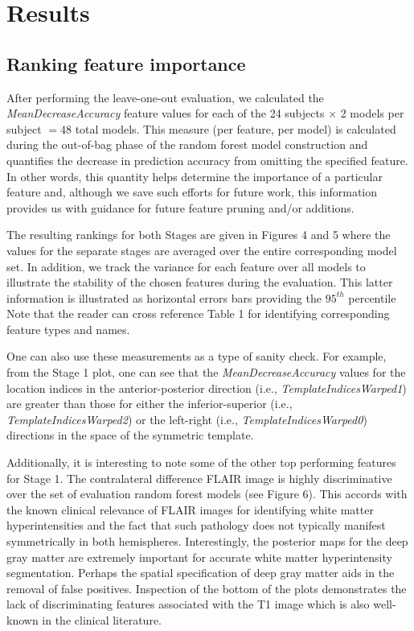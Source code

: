 \documentclass[11pt,]{article}
\begin{document}
\section{Results}\label{results}

\subsection{Ranking feature
importance}\label{ranking-feature-importance}

After performing the leave-one-out evaluation, we calculated the
\emph{MeanDecreaseAccuracy} feature values for each of the 24 subjects
\(\times\) 2 models per subject \(=48\) total models. This measure (per
feature, per model) is calculated during the out-of-bag phase of the
random forest model construction and quantifies the decrease in
prediction accuracy from omitting the specified feature. In other words,
this quantity helps determine the importance of a particular feature
and, although we save such efforts for future work, this information
provides us with guidance for future feature pruning and/or additions.

The resulting rankings for both Stages are given in Figures 4 and 5
where the values for the separate stages are averaged over the entire
corresponding model set. In addition, we track the variance for each
feature over all models to illustrate the stability of the chosen
features during the evaluation. This latter information is illustrated
as horizontal errors bars providing the \(95^{th}\) percentile Note that
the reader can cross reference Table 1 for identifying corresponding
feature types and names.

One can also use these measurements as a type of sanity check. For
example, from the Stage 1 plot, one can see that the
\emph{MeanDecreaseAccuracy} values for the location indices in the
anterior-posterior direction (i.e., \emph{TemplateIndicesWarped1}) are
greater than those for either the inferior-superior (i.e.,
\emph{TemplateIndicesWarped2}) or the left-right (i.e.,
\emph{TemplateIndicesWarped0}) directions in the space of the symmetric
template.

Additionally, it is interesting to note some of the other top performing
features for Stage 1. The contralateral difference FLAIR image is highly
discriminative over the set of evaluation random forest models (see
Figure 6). This accords with the known clinical relevance of FLAIR
images for identifying white matter hyperintensities and the fact that
such pathology does not typically manifest symmetrically in both
hemispheres. Interestingly, the posterior maps for the deep gray matter
are extremely important for accurate white matter hyperintensity
segmentation. Perhaps the spatial specification of deep gray matter aids
in the removal of false positives. Inspection of the bottom of the plots
demonstrates the lack of discriminating features associated with the T1
image which is also well-known in the clinical literature.
\end{document}
